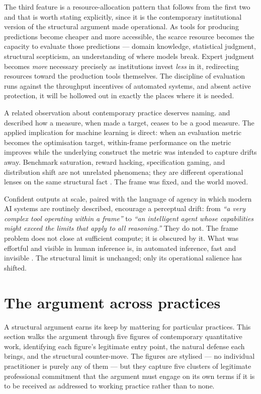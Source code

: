 \documentclass[11pt,a4paper]{article}
\begin{document}
The third feature is a resource-allocation pattern that follows from the
first two and that is worth stating explicitly, since it is the
contemporary institutional version of the structural argument made
operational. As tools for producing predictions become cheaper and more
accessible, the scarce resource becomes the capacity to evaluate those
predictions --- domain knowledge, statistical judgment, structural
scepticism, an understanding of where models break. Expert judgment
becomes \emph{more} necessary precisely as institutions invest \emph{less}
in it, redirecting resources toward the production tools themselves. The
discipline of evaluation runs against the throughput incentives of
automated systems, and absent active protection, it will be hollowed out
in exactly the places where it is needed.

A related observation about contemporary practice deserves naming. \citet{Goodhart1975} and
\citet{Strathern1997} described how a measure, when made a target, ceases
to be a good measure. The applied implication for machine learning is
direct: when an evaluation metric becomes the optimisation target,
within-frame performance on the metric improves while the underlying
construct the metric was intended to capture drifts away. Benchmark
saturation, reward hacking, specification gaming, and distribution shift
are not unrelated phenomena; they are different operational lenses on the
same structural fact \citep{Amodei2016,Christian2020}. The frame was
fixed, and the world moved.

Confident outputs at scale, paired with the language of agency in which
modern AI systems are routinely described, encourage a perceptual drift:
from \emph{``a very complex tool operating within a frame''} to
\emph{``an intelligent agent whose capabilities might exceed the limits
that apply to all reasoning.''} They do not. The frame problem does not
close at sufficient compute; it is obscured by it. What was effortful and
visible in human inference is, in automated inference, fast and
invisible \citep{RussellS2019,Christian2020}. The structural limit is
unchanged; only its operational salience has shifted.

\section{The argument across practices}
\label{sec:practices}

A structural argument earns its keep by mattering for particular
practices. This section walks the argument through five figures of
contemporary quantitative work, identifying each figure's legitimate
entry point, the natural defense each brings, and the structural
counter-move. The figures are stylised --- no individual practitioner is
purely any of them --- but they capture five clusters of legitimate
professional commitment that the argument must engage on its own terms if
it is to be received as addressed to working practice rather than to
none.
\end{document}
